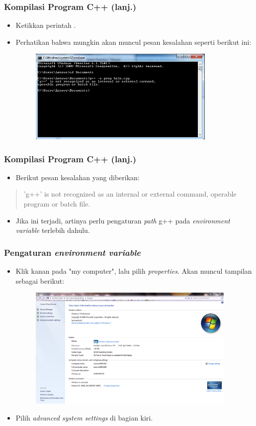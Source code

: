 \begin{frame}
\frametitle{Kompilasi Program C++ (lanj.)}
\begin{itemize}
  \item Ketikkan perintah \compilehelo.
  \item Perhatikan bahwa mungkin akan muncul pesan kesalahan seperti berikut ini:
  \begin{figure}
    \includegraphics[width=9cm]{asset/cpp-compile-1.png}
  \end{figure}
\end{itemize}
\end{frame}

\begin{frame}[fragile]
\frametitle{Kompilasi Program C++ (lanj.)}
\begin{itemize}
  \item Berikut pesan kesalahan yang diberikan:
\end{itemize}
\begin{quote}
'g++' is not recognized as an internal or external command, operable program or batch file.
\end{quote}
\begin{itemize}
  \item Jika ini terjadi, artinya perlu pengaturan \textit{path} g++ pada \textit{environment variable} terlebih dahulu.
\end{itemize}
\end{frame}

\begin{frame}
\frametitle{Pengaturan \textit{environment variable}}
\begin{itemize}
  \item Klik kanan pada "my computer", lalu pilih \textit{properties}. Akan muncul tampilan sebagai berikut:
  \begin{figure}
    \includegraphics[width=10cm]{asset/path_1.PNG}
  \end{figure}
  \item Pilih \textit{advanced system settings} di bagian kiri.
\end{itemize}
\end{frame}

